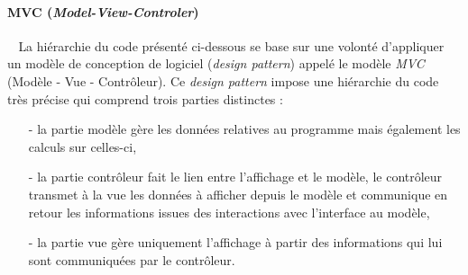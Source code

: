 \documentclass[12pt]{article}
\def\tab{$\>\>\>\>$}
\begin{document}
\paragraph{MVC (\textit{Model-View-Controler})\\}
\tab La hiérarchie du code présenté ci-dessous se base sur une volonté d'appliquer un modèle de conception de logiciel (\textit{design pattern}) appelé le modèle \textit{MVC} (Modèle - Vue - Contrôleur). Ce \textit{design pattern} impose une hiérarchie du code très précise qui comprend trois parties distinctes : \begin{itemize}
\item[-] la partie modèle gère les données relatives au programme mais également les calculs sur celles-ci,
\item[-] la partie contrôleur fait le lien entre l'affichage et le modèle, le contrôleur transmet à la vue les données à afficher depuis le modèle et communique en retour les informations issues des interactions avec l'interface au modèle,
\item[-] la partie vue gère uniquement l'affichage à partir des informations qui lui sont communiquées par le contrôleur.
\end{itemize}

\newpage
\paragraph{\\}
\end{document}
